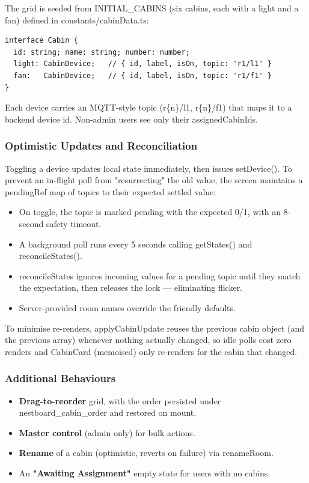 \documentclass[11pt,a4paper]{article}
\newcommand{\code}[1]{\colorbox{codebg}{\ttfamily\small #1}}
\begin{document}
The grid is seeded from \code{INITIAL\_CABINS} (six cabins, each with a light
and a fan) defined in \code{constants/cabinData.ts}:

\begin{lstlisting}[language=tsx]
interface Cabin {
  id: string; name: string; number: number;
  light: CabinDevice;   // { id, label, isOn, topic: 'r1/l1' }
  fan:   CabinDevice;   // { id, label, isOn, topic: 'r1/f1' }
}
\end{lstlisting}

Each device carries an MQTT-style \code{topic} (\code{r\{n\}/l1},
\code{r\{n\}/f1}) that maps it to a backend device id. Non-admin users see only
their \code{assignedCabinIds}.

\subsubsection{Optimistic Updates and Reconciliation}

Toggling a device updates local state immediately, then issues
\code{setDevice()}. To prevent an in-flight poll from "resurrecting" the old
value, the screen maintains a \code{pendingRef} map of topics to their expected
settled value:

\begin{itemize}[leftmargin=1.4em]
  \item On toggle, the topic is marked pending with the expected 0/1, with an
        8-second safety timeout.
  \item A background poll runs every 5 seconds calling \code{getStates()} and
        \code{reconcileStates()}.
  \item \code{reconcileStates} ignores incoming values for a pending topic until
        they match the expectation, then releases the lock — eliminating flicker.
  \item Server-provided room names override the friendly defaults.
\end{itemize}

To minimise re-renders, \code{applyCabinUpdate} reuses the previous cabin object
(and the previous array) whenever nothing actually changed, so idle polls cost
zero renders and \code{CabinCard} (memoised) only re-renders for the cabin that
changed.

\subsubsection{Additional Behaviours}

\begin{itemize}[leftmargin=1.4em]
  \item \textbf{Drag-to-reorder} grid, with the order persisted under
        \code{nestboard\_cabin\_order} and restored on mount.
  \item \textbf{Master control} (admin only) for bulk actions.
  \item \textbf{Rename} of a cabin (optimistic, reverts on failure) via
        \code{renameRoom}.
  \item An \textbf{"Awaiting Assignment"} empty state for users with no cabins.
\end{itemize}
\end{document}
